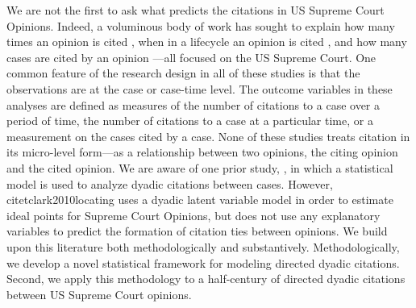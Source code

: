 \documentclass[headsepline=true, abstracton]{scrartcl}
\begin{document}
We are not the first to ask what predicts the citations in US Supreme Court Opinions. Indeed, a voluminous body of work has sought to explain how many times an opinion is cited \citep[e.g.,][]{cross2010determinants,benjamin2012standing}, when in a lifecycle an opinion is cited \citep[e.g.,][]{black2013citation,spriggs2001explaining}, and how many cases are cited by an opinion \citep[e.g.,][]{lupu2013strategic}---all focused on the US Supreme Court. One common feature of the research design in all of these studies is that the observations are at the case or case-time level. The outcome variables in these analyses are defined as measures of the number of citations to a case over a period of time, the number of citations to a case at a particular time, or a measurement on the cases cited by a case. None of these studies treats citation in its micro-level form---as a relationship between two opinions, the citing opinion and the cited opinion. We are aware of one prior study, \citet{clark2010locating}, in which a statistical model is used to analyze dyadic citations between cases. However, citet{clark2010locating} uses a dyadic latent variable model in order to estimate ideal points for Supreme Court Opinions, but does not use any explanatory variables to predict the formation of citation ties between opinions. We build upon this literature both methodologically and substantively. Methodologically, we develop a novel statistical framework for modeling directed dyadic citations. Second, we apply this methodology to a half-century of directed dyadic citations between US Supreme Court opinions.
\end{document}
